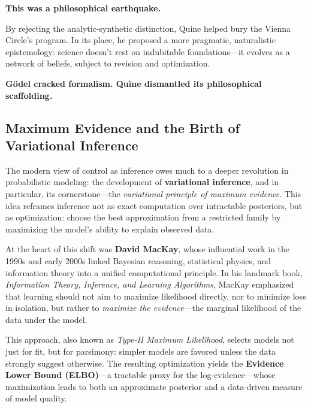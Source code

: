 \begin{tcolorbox}[colback=gray!5!white, colframe=black!75!white, title={Historical Sidebar: W.V.O. Quine and the Death of the Analytic-Synthetic Divide}]
    \medskip
    
    \textbf{This was a philosophical earthquake.}

    \medskip
    
    By rejecting the analytic-synthetic distinction, Quine helped bury the Vienna Circle's program. In its place, he proposed a more pragmatic, naturalistic epistemology: science doesn’t rest on indubitable foundations—it evolves as a network of beliefs, subject to revision and optimization.
    
    \medskip
    
    \textbf{Gödel cracked formalism. Quine dismantled its philosophical scaffolding.}
    
\end{tcolorbox}



\subsection{Maximum Evidence and the Birth of Variational Inference}

The modern view of control as inference owes much to a deeper revolution in probabilistic modeling: the development of \textbf{variational inference}, and in particular, its cornerstone—the \emph{variational principle of maximum evidence}. This idea reframes inference not as exact computation over intractable posteriors, but as optimization: choose the best approximation from a restricted family by maximizing the model's ability to explain observed data.

At the heart of this shift was \textbf{David MacKay}, whose influential work in the 1990s and early 2000s linked Bayesian reasoning, statistical physics, and information theory into a unified computational principle. In his landmark book, \emph{Information Theory, Inference, and Learning Algorithms}, MacKay emphasized that learning should not aim to maximize likelihood directly, nor to minimize loss in isolation, but rather to \emph{maximize the evidence}—the marginal likelihood of the data under the model.

This approach, also known as \emph{Type-II Maximum Likelihood}, selects models not just for fit, but for parsimony: simpler models are favored unless the data strongly suggest otherwise. The resulting optimization yields the \textbf{Evidence Lower Bound (ELBO)}—a tractable proxy for the log-evidence—whose maximization leads to both an approximate posterior and a data-driven measure of model quality.

